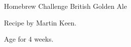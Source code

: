 \stylesection{\stylebritishgoldenale}

\begin{recipe}{Homebrew Challenge British Golden Ale}

\begin{aboutblock}
Recipe by Martin Keen.
\sourcehomebrewchallenge
\end{aboutblock}


\begin{methodandtiming}

\begin{mashsteps}
\end{mashsteps}

\begin{fermentationsteps}
\end{fermentationsteps}

\begin{directions}
Age for 4 weeks.
\end{directions}

\end{methodandtiming}

\recipebreak

\begin{ingredientsblock}

\begin{malts}
\end{malts}

\begin{hops}
\end{hops}


\end{ingredientsblock}

\end{recipe}
